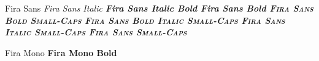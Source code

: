 \documentclass{article}
\begin{document}
\sffamily
Fira Sans
\itshape Fira Sans Italic
\bfseries Fira Sans Italic Bold
\upshape Fira Sans Bold
\scshape Fira Sans Bold Small-Caps
\itshape Fira Sans Bold Italic Small-Caps
\mdseries Fira Sans Italic Small-Caps
\upshape Fira Sans Small-Caps

\ttfamily
Fira Mono
\bfseries Fira Mono Bold
\end{document}
